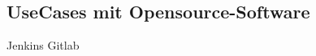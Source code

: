 \subsection{UseCases mit Opensource-Software}
\label{UseCases mit Opensource-Software}

Jenkins
Gitlab